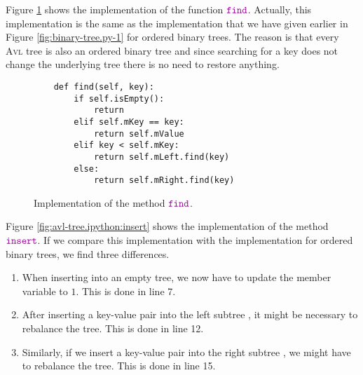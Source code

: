 Figure \ref{fig:avl-tree.ipython:find} shows the implementation of the function $\mytt{find}$.
Actually, this implementation is the same as the implementation that we have given earlier in Figure
\ref{fig:binary-tree.py-1} for ordered binary trees.  The reason is that every \textsc{Avl} tree is also an
ordered binary tree and since searching for a key does not change the underlying tree there is no need to
restore anything. 

\begin{figure}[!ht]
\centering
\begin{verbatim}
    def find(self, key):
        if self.isEmpty():
            return
        elif self.mKey == key:
            return self.mValue
        elif key < self.mKey:
            return self.mLeft.find(key)
        else:
            return self.mRight.find(key)
\end{verbatim}
\vspace*{-0.3cm}
\caption{Implementation of the method $\mytt{find}$.}
\label{fig:avl-tree.ipython:find}
\end{figure}

Figure \ref{fig:avl-tree.ipython:insert} shows the implementation of the method $\mytt{insert}$.
If we compare this implementation with the implementation for ordered binary trees, we find three
differences.
\begin{enumerate}
\item When inserting into an empty tree, we now have to update the member variable 
      to $1$.  This is done in line 7.
\item After inserting a key-value pair into the left subtree , it might be necessary to 
      rebalance the tree.  This is done in line 12.
\item Similarly, if we insert a key-value pair into the right subtree , we might have to rebalance 
      the tree.  This is done in line 15.
\end{enumerate}

